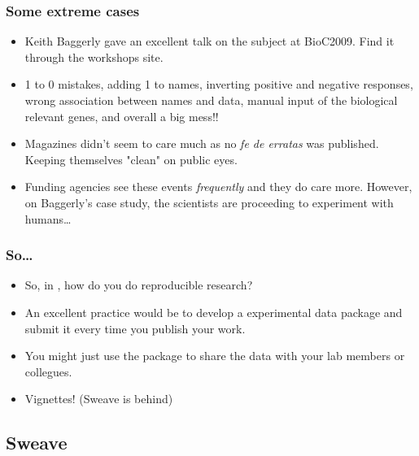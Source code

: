 \begin{frame}[allowframebreaks]
  \frametitle{Some extreme cases}
  \begin{itemize}
  \item Keith Baggerly gave an excellent talk on the subject at BioC2009. Find it through the workshops site.
  \item 1 to 0 mistakes, adding 1 to names, inverting positive and negative responses, wrong association between names and data, \alert{manual} input of the biological relevant genes, and overall a big mess!!
  \item Magazines didn't seem to care much as no \emph{fe de erratas} was published. Keeping themselves "clean" on public eyes.
  \item Funding agencies see these events \emph{frequently} and they do care more. However, on Baggerly's case study, the scientists are proceeding to experiment with humans\ldots
  \end{itemize}
\end{frame}


\begin{frame}[allowframebreaks]
  \frametitle{So\ldots}
  \begin{itemize}
  \item So, in , how do you do reproducible research?
  \item An excellent practice would be to develop a experimental data package and submit it every time you publish your work. 
  \item You might just use the package to share the data with your lab members or collegues. 
  \item Vignettes! (Sweave is behind)
  \end{itemize}
\end{frame}

\subsection{Sweave}


